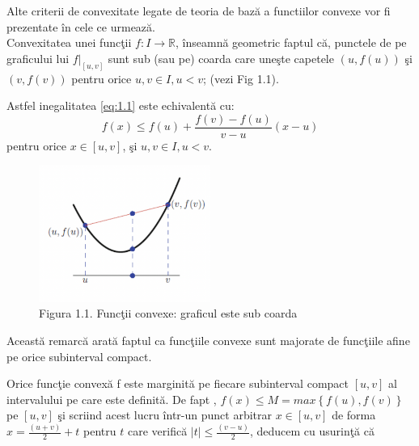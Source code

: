 \documentclass[a4paper,12pt,oneside]{report}
\begin{document}
Alte criterii de convexitate legate de teoria de baz\u{a} a func{t}iilor convexe vor fi prezentate \^{i}n cele ce urmeaz\u{a}.\\

Convexitatea unei func\c{t}ii \(f : I\rightarrow \mathbb{R}\), \^{i}nseamn\u{a} geometric faptul c\u{a}, punctele de pe graficului lui  \(f|_{\left [ u,v \right ]}\) sunt sub (sau pe) coarda care une\c{s}te capetele \(\left ( u , f {\left ( u \right )} \right )\)  \c{s}i \(\left ( v , f {\left ( v \right )} \right )\) pentru orice \(u, v \in I, u < v\);
(vezi Fig 1.1).

Astfel inegalitatea \ref{eq:1.1} este echivalent\u{a} cu:
\begin{displaymath}
  f\left ( x \right )\leq f\left ( u \right ) +\frac{f\left ( v \right )- f\left ( u \right )}{v - u}\left ( x - u \right ) \label{eq:1.2} \tag{1.2}
\end{displaymath}
pentru orice \(x\in \left [  u, v\right ]\), \c{s}i \(u, v \in I, u < v\).

\begin{figure}[htbp]
	\centering
	\includegraphics[width=0.5\textwidth]{fig1.1.png}
	\caption{Figura 1.1. Func\c{t}ii convexe: graficul este sub coarda}
\end{figure}

Aceast\u{a} remarc\u{a} arat\u{a} faptul ca func\c{t}iile convexe sunt majorate de func\c{t}iile afine pe orice subinterval compact.

Orice func\c{t}ie convex\u{a} f este marginit\u{a} pe fiecare subinterval compact \(\left [ u , v \right ]\) al intervalului pe care este definit\u{a}. De fapt , \(f\left ( x \right ) \leq  M = max \left \{ f\left ( u \right ), f\left ( v \right ) \right \}\)  pe \(\left [ u , v \right ]\)  \c{s}i scriind acest lucru \^{i}ntr-un punct arbitrar \(x\in  \left [ u , v  \right ]\)  de forma  \(x= \frac{\left ( u + v \right )}{2} + t\) pentru  \(t\) care verific\u{a} \(\left | t \right |\leq \frac{\left ( v - u \right )}{2}\), deducem cu usurin\c{t}\u{a} c\u{a}
\end{document}

